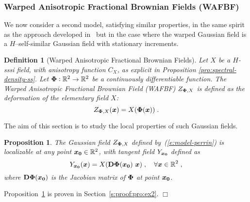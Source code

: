 \documentclass{elsarticle}
\newtheorem{proposition}{Proposition}
\newtheorem{definition}{Definition}
\newenvironment{proof}{\medskip\noindent{\bf Proof.}\;}{\null\hfill $\Box$\par\medskip }
\def\R{\mbox{$\mathbb{R}$}}
\begin{document}
\subsubsection{Warped  Anisotropic Fractional Brownian Fields (WAFBF)\\}\label{s:perrin}

We now consider a second model, satisfying similar properties, in the same spirit as the approach developed in~\cite{perrin1999reducing,Per00,guyon2000identification} but in the case where the warped Gaussian field is a $H$--self-similar Gaussian field with stationary increments.
\begin{definition}[Warped  Anisotropic Fractional Brownian Fields]
\label{def:wafbf}
Let $X$ be a $H$-sssi field, with anisotropy function $C_X$, as explicit in Proposition \ref{pro:spectral-density-ss}. 
Let $\mathbf{\Phi} : \mathbb{R}^2 \to \mathbb{R}^2$ be a continuously differentiable function. The Warped  Anisotropic Fractional Brownian Field (WAFBF)  $Z_{\mathbf{\Phi},X}$ is defined as the deformation of the elementary field $X$:
\begin{equation}\label{e:model-perrin}
Z_{\mathbf{\Phi},X}(\bm{x})=X(\mathbf{\Phi}(\bm{x}))\;.
\end{equation}
\end{definition}
The aim of this section is to study the local properties of such Gaussian fields.
%
\begin{proposition}\label{pro:ex2}
The Gaussian field $Z_{\mathbf{\Phi},X}$ defined by~(\ref{e:model-perrin}) is localizable at any point $\bm{x_0}\in\mathbb{R}^2$, with tangent field $Y_{\bm{x_0}}$ defined as
 \begin{equation}
 \label{eq:tfZ}
 Y_{\vect{x_0}}(\vect{x})=X(\ope{D}\ope{\Phi}(\vect{x_0})~ \vect{x})\;, \quad \forall  \vect{x}\in\R^2\;,
 \end{equation}
 where $\mathbf{D}\mathbf{\Phi}(\bm{x_0})$ is the Jacobian matrix of $\mathbf{\Phi}$ at point $\bm{x_0}$.
\end{proposition}
%
\begin{proof}
Proposition~\ref{pro:ex2} is proven in Section~\ref{s:proof:pro:ex2}.
\end{proof}
\end{document}
